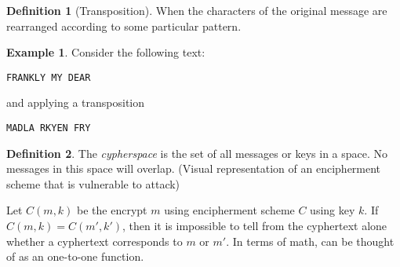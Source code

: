 \documentclass[11pt]{amsart}
\theoremstyle{definition}\newtheorem{definition}{Definition}
\theoremstyle{definition}\newtheorem{example}{Example}
\begin{document}
\begin{definition}[Transposition]
    When the characters of the original message are rearranged according to some particular pattern.
\end{definition}
    
\begin{example}
    Consider the following text:
    \begin{center}
        \verb|FRANKLY MY DEAR|
    \end{center}
    and applying a transposition
    \begin{center}
        \verb|MADLA RKYEN FRY|
    \end{center}
\end{example}

\begin{definition}
    The \emph{cypherspace} is the set of all messages or keys in a space. No messages in this space will overlap. (Visual representation of an encipherment scheme that is vulnerable to attack)
\end{definition}

Let $C(m, k)$ be the encrypt $m$ using encipherment scheme $C$ using key $k$. If $C(m, k) = C(m', k')$, then it is impossible to tell from the cyphertext alone whether a cyphertext corresponds to $m$ or $m'$. In terms of math, can be thought of as an one-to-one function.
\end{document}
